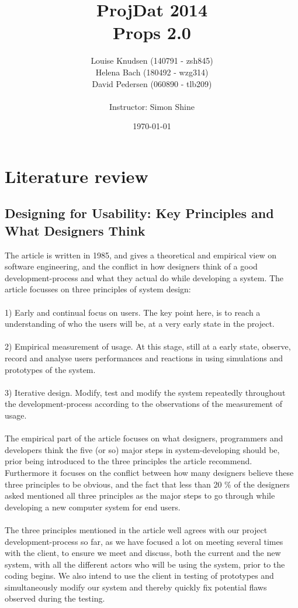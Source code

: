 \documentclass[12pt]{article}
\title{ProjDat 2014\\Props 2.0}
\author{Louise Knudsen (140791 - zsh845)\\
Helena Bach (180492 - wzg314)\\
David Pedersen (060890 - tlb209)\\\\
Instructor: Simon Shine }
\date{\today}
\begin{document}
\maketitle
\newpage
\section*{Literature review}
\subsection*{Designing for Usability: Key Principles and What Designers Think}
The article is written in 1985, and gives a theoretical and empirical view on software engineering, and the conflict in how designers think of a good development-process and what they actual do while developing a system. The article focusses on three principles of system design: \\\\
1) Early and continual focus on users. The key point here, is to reach a understanding of who the users will be, at a very early state in the project. \\\\
2) Empirical measurement of usage. At this stage, still at a early state, observe, record and analyse users performances and reactions in using simulations and prototypes of the system.\\\\
3) Iterative design. Modify, test and modify the system repeatedly throughout the development-process according to the observations of the measurement of usage. \\\\
The empirical part of the article focuses on what designers, programmers and developers think the five (or so) major steps in system-developing should be, prior being introduced to the three principles the article recommend. Furthermore it focuses on the conflict between how many designers believe these three principles to be obvious, and the fact that less than 20 \% of the designers asked mentioned all three principles as the major steps to go through while developing a new computer system for end users. \\\\
The three principles mentioned in the article well agrees with our project development-process so far, as we have focused a lot on meeting several times with the client, to ensure we meet and discuss, both the current and the new system, with all the different actors who will be using the system, prior to the coding begins. We also intend to use the client in testing of prototypes and simultaneously modify our system and thereby quickly fix potential flaws observed during the testing.
\end{document}
